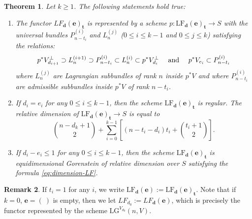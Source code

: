 \documentclass[a4paper]{amsart}
\theoremstyle{plain}
\newtheorem{theorem}{Theorem}[section]
\theoremstyle{definition}
\newtheorem{remark}[theorem]{Remark}
\numberwithin{equation}{section}
\newcommand{\LG}{\mathrm{LG}}
\newcommand{\LF}{\mathrm{LF}}
\begin{document}
\begin{theorem}\label{prop:lf_regular_gorenstein} Let $k \geq 1$. The following statements hold true:
    \begin{enumerate}
        \item 	The functor $LF_{\mathbf{d}}(\mathbf{e})_{\mathbf{t}}$ is represented by a scheme $p:\mathrm{LF}_{\mathbf{d}}(\mathbf{e})_{\mathbf{t}} \to S$ with the universal bundles
              $P_{n-t_i}^{(i)}$ and $L_{n}^{(j)}$ ($0\leq i \leq k-1$ and $0\leq j \leq k$) satisfying the relations:
              \[ p^*V_{d_{i+1}}^\perp \supset  L_{n}^{(i+1)} \supset P_{n-t_i}^{(i)} \subset L_{n}^{(i)} \subset p^*V_{d_i}^\perp \quad  \textnormal{ and } \quad  p^*V_{e_i} \subset P_{n-t_i}^{(i)} \]
              where $L_n^{(j)}$ are Lagrangian subbundles of rank $n$ inside $p^*V$ and where $P_{n-t_i}^{(i)}$ are admissible subbundles inside $p^*V$ of rank $n-t_i$.
        \item  If $d_i = e_{i}$ for any $ 0 \leq i \leq k-1$, then the scheme $\mathrm{LF}_{\mathbf{d}}(\mathbf{e})_{\mathbf{t}}$ is regular. The relative dimension of $\mathrm{LF}_{\mathbf{d}}(\mathbf{e})_{\mathbf{t}}  \to S$ is equal to
              \begin{equation}\label{eq:dimension-LF}
                  \binom{n-d_{k}+1}{2} + \sum_{i=0}^{k-1}[(n-t_{i} - d_i)t_i + \binom{t_{i}+1}{2}].
              \end{equation}
        \item If $d_i -e_{i} \leq 1$ for any $ 0 \leq i \leq k-1$, then the scheme $\mathrm{LF}_{\mathbf{d}}(\mathbf{e})_{\mathbf{t}}$ is equidimensional Gorenstein of relative dimension over $S$ satisfying the formula \eqref{eq:dimension-LF}.
    \end{enumerate}
\end{theorem}
\begin{remark}
    If $t_i =1$ for any $i$, we write $\LF_{\mathbf{d}}(\mathbf{e}):= \LF_{\mathbf{d}}(\mathbf{e})_{\mathbf{t}}$. Note that if $k=0$, $\mathbf{e} = (~)$ is empty, then we let $LF_{d_0}:= LF_{\mathbf{d}}(\mathbf{e}) $, which is precisely the functor represented by the scheme $\LG^{V_{d_0}}(n,V)$.
\end{remark}
\end{document}

